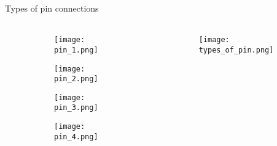 \documentclass[aspectratio=169]{beamer}
\begin{document}
\begin{frame}[t]{Types of pin connections}
    \framesubtitle{}
    \vspace{-0.6cm}
    \begin{columns}[T,onlytextwidth]
        \begin{column}{0.69\textwidth}
            \begin{figure}[H]
                \begin{subfigure}{0.49\textwidth}
                    \centering\texttt{[image: pin\_1.png]}
                    \label{fig:pin_1.png}
                \end{subfigure}
                \begin{subfigure}{0.49\textwidth}
                    \centering\texttt{[image: pin\_2.png]}
                    \label{fig:pin_2.png}
                \end{subfigure}

                \begin{subfigure}{0.49\textwidth}
                    \centering\texttt{[image: pin\_3.png]}
                    \label{fig:pin_3.png}
                \end{subfigure}
                \begin{subfigure}{0.49\textwidth}
                    \centering\texttt{[image: pin\_4.png]}
                    \label{fig:pin_4.png}
                \end{subfigure}
            \end{figure}
        \end{column}
        \begin{column}{0.29\textwidth}
            \vspace{1cm}
            \begin{figure}[H]
                \centering\texttt{[image: types\_of\_pin.png]}
                \label{fig:types_of_pin.png}
            \end{figure}
        \end{column}
    \end{columns}
\end{frame}
\end{document}
